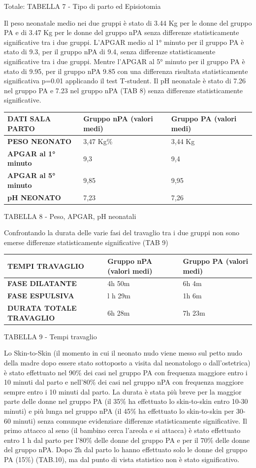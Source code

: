\documentclass[]{article}
\begin{document}
Totale: TABELLA 7 - Tipo di parto ed Episiotomia

Il peso neonatale medio nei due gruppi è stato di 3.44 Kg per le donne
del gruppo PA e di 3.47 Kg per le donne del gruppo nPA senza differenze
statisticamente significative tra i due gruppi. L'APGAR medio al 1°
minuto per il gruppo PA è stato di 9.3, per il gruppo nPA di 9.4, senza
differenze statisticamente significative tra i due gruppi. Mentre
l'APGAR al 5° minuto per il gruppo PA è stato di 9.95, per il gruppo nPA
9.85 con una differenza risultata statisticamente significativa p=0.01
applicando il test T-student. Il pH neonatale è stato di 7.26 nel gruppo
PA e 7.23 nel gruppo nPA (TAB 8) senza differenze statisticamente
significative.

\begin{longtable}[]{@{}lll@{}}
\toprule
\textbf{DATI SALA PARTO} & \textbf{Gruppo nPA (valori medi)} &
\textbf{Gruppo PA (valori medi)}\tabularnewline
\midrule
\endhead
\textbf{PESO NEONATO} & 3,47 Kg\% & 3,44 Kg\tabularnewline
\textbf{APGAR al 1° minuto} & 9,3 & 9,4\tabularnewline
\textbf{APGAR al 5° minuto} & 9,85 & 9,95\tabularnewline
\textbf{pH NEONATO} & 7,23 & 7,26\tabularnewline
\bottomrule
\end{longtable}

TABELLA 8 - Peso, APGAR, pH neonatali

Confrontando la durata delle varie fasi del travaglio tra i due gruppi
non sono emerse differenze statisticamente significative (TAB 9)

\begin{longtable}[]{@{}lll@{}}
\toprule
\textbf{TEMPI TRAVAGLIO} & \textbf{Gruppo nPA (valori medi)} &
\textbf{Gruppo PA (valori medi)}\tabularnewline
\midrule
\endhead
\textbf{FASE DILATANTE} & 4h 50m & 6h 4m\tabularnewline
\textbf{FASE ESPULSIVA} & l h 29m & 1h 6m\tabularnewline
\textbf{DURATA TOTALE TRAVAGLIO} & 6h 28m & 7h 23m\tabularnewline
\bottomrule
\end{longtable}

TABELLA 9 - Tempi travaglio

Lo Skin-to-Skin (il momento in cui il neonato nudo viene messo sul petto
nudo della madre dopo essere stato sottoposto a visita dal neonatologo o
dall'ostetrica) è stato effettuato nel 90\% dei casi nel gruppo PA con
frequenza maggiore entro i 10 minuti dal parto e nell'80\% dei casi nel
gruppo nPA con frequenza maggiore sempre entro i 10 minuti dal parto. La
durata è stata più breve per la maggior parte delle donne nel gruppo PA
(il 35\% ha effettuato lo skin-to-skin entro 10-30 minuti) e più lunga
nel gruppo nPA (il 45\% ha effettuato lo skin-to-skin per 30-60 minuti)
senza comunque evidenziare differenze statisticamente significative. Il
primo attacco al seno (il bambino cerca l'areola e si attacca) è stato
effettuato entro 1 h dal parto per l'80\% delle donne del gruppo PA e
per il 70\% delle donne del gruppo nPA. Dopo 2h dal parto lo hanno
effettuato solo le donne del gruppo PA (15\%) (TAB.10), ma dal punto di
vista statistico non è stato significativo.
\end{document}
